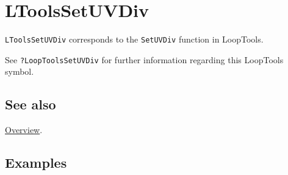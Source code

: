 \documentclass[../FeynHelpersManual.tex]{subfiles}
\begin{document}
\hypertarget{ltoolssetuvdiv}{
\section{LToolsSetUVDiv}\label{ltoolssetuvdiv}}

\texttt{LToolsSetUVDiv} corresponds to the \texttt{SetUVDiv} function in
LoopTools.

See \texttt{?LoopTools\textasciigrave SetUVDiv} for further information
regarding this LoopTools symbol.

\subsection{See also}

\hyperlink{toc}{Overview}.

\subsection{Examples}
\end{document}
